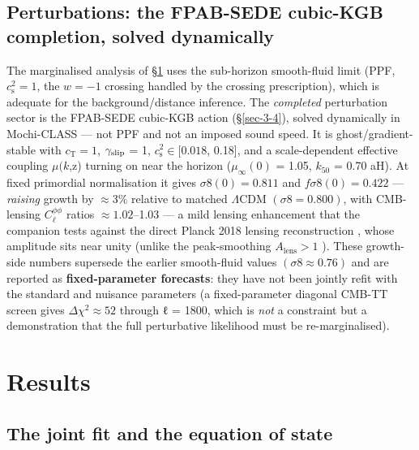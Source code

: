 \documentclass[preprint,12pt]{elsarticle}
\begin{document}
\subsection{Perturbations: the FPAB-SEDE cubic-KGB completion, solved
dynamically}\label{sec-4-4}

The marginalised analysis of §\ref{sec-5} uses the sub-horizon
smooth-fluid limit (PPF, \(c_{\mathrm{s}}^{2} = 1\), the \(w = -1\)
crossing handled by the crossing prescription), which is adequate for
the background/distance inference. The \emph{completed} perturbation
sector is the FPAB-SEDE cubic-KGB action (§\ref{sec-3-4}), solved
dynamically in Mochi-CLASS --- not PPF and not an imposed sound speed.
It is ghost/gradient-stable with \(c_{\mathrm{T}} = 1\),
\(\gamma_{\rm slip}\) = 1, \(c_{\mathrm{s}}^{2} \in  [0.018\), 0.18{]},
and a scale-dependent effective coupling \(\mu (k\),z) turning on near
the horizon (\(\mu_\infty(0)\) = 1.05, \(k_{50}\) = 0.70 aH). At fixed
primordial normalisation it gives \(\sigma 8(0) = 0.811\) and
\(f\sigma 8(0) = 0.422\) --- \emph{raising} growth by \(\approx  3\)\%
relative to matched \(\Lambda \mathrm{CDM}\) \((\sigma 8 = 0.800)\),
with CMB-lensing \(C_\ell ^{\phi \phi }\) ratios \(\approx  1.02\)--1.03
--- a mild lensing enhancement that the companion tests against the
direct Planck 2018 lensing reconstruction \citep{Planck:2018lbu}, whose
amplitude sits near unity (unlike the peak-smoothing
\(A_{\mathrm{lens}} > 1\) \citep{Motloch:2018pjy, Addison:2023fqc}).
These growth-side numbers supersede the earlier smooth-fluid values
\((\sigma 8 \approx  0.76)\) and are reported as \textbf{fixed-parameter
forecasts}: they have not been jointly refit with the standard and
nuisance parameters (a fixed-parameter diagonal CMB-TT screen gives
\(\Delta \chi ^{2} \approx  52\) through ℓ = 1800, which is \emph{not} a
constraint but a demonstration that the full perturbative likelihood
must be re-marginalised).

\section{Results}\label{sec-5}

\subsection{The joint fit and the equation of state}\label{sec-5-1}
\end{document}
